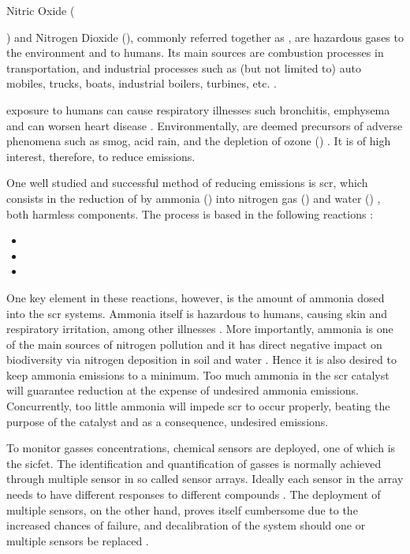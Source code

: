 Nitric Oxide ({) and Nitrogen Dioxide (), commonly referred together as \nox,  are hazardous gases to the environment and to humans. Its main sources are combustion processes in transportation, and industrial processes such as (but not limited to) auto mobiles, trucks, boats, industrial boilers, turbines, etc. \cite{EPA_2019}.

\nox exposure to humans can cause respiratory illnesses such bronchitis, emphysema and can worsen heart disease \cite{Boningari_2016}. Environmentally, \nox are deemed precursors of adverse phenomena such as smog, acid rain, and the depletion of ozone () \cite{Bernabeo_2019}. It is of high interest, therefore, to reduce \nox emissions.

One well studied and successful method of reducing emissions is \acrfull{scr}, which consists in the reduction of \nox by ammonia () into nitrogen gas () and water () \cite{Forzatti_2001}, both harmless components. The process is based in the following reactions \cite{Forzatti_2001}:
\begin{itemize}
	\item {}
	
	\item {}
	
	\item {}
\end{itemize}


One key element in these reactions, however, is the amount of ammonia dosed into the \acrshort{scr} systems. Ammonia itself is hazardous to humans, causing skin and respiratory irritation, among other illnesses \cite{ASTDRA_2004}. More importantly, ammonia is one of the main sources of nitrogen pollution and it has direct negative impact on biodiversity via nitrogen deposition in soil and water \cite{RAND_2018}. Hence it is also desired to keep ammonia emissions to a minimum. Too much ammonia in the \acrshort{scr} catalyst will guarantee \nox reduction at the expense of undesired ammonia emissions. Concurrently, too little ammonia will impede \acrshort{scr} to occur properly, beating the purpose of the catalyst and as a consequence, undesired \nox emissions.

To monitor gasses concentrations, chemical sensors are deployed, one of which is the \acrfull{sicfet}. The identification and quantification of gasses is normally achieved through multiple sensor in so called sensor arrays. Ideally each sensor in the array needs to have different responses to different compounds \cite{Bastuck_2019}. The deployment of multiple sensors, on the other hand, proves itself cumbersome due to the increased chances of failure, and decalibration of the system should one or multiple sensors be replaced \cite{Bastuck_2019}.

}
